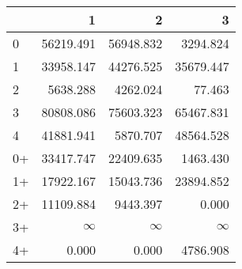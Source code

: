 \begin{tabular}{lrrr}
\toprule
     &         1 &         2 &         3 \\
\midrule
 0   & \num{56219.491} & \num{56948.832} &  \num{3294.824} \\
 1   & \num{33958.147} & \num{44276.525} & \num{35679.447} \\
 2   &  \num{5638.288} &  \num{4262.024} &    \num{77.463} \\
 3   & \num{80808.086} & \num{75603.323} & \num{65467.831} \\
 4   & \num{41881.941} &  \num{5870.707} & \num{48564.528} \\
 0+  & \num{33417.747} & \num{22409.635} &  \num{1463.430} \\
 1+  & \num{17922.167} & \num{15043.736} & \num{23894.852} \\
 2+  & \num{11109.884} &  \num{9443.397} &     \num{0.000} \\
 3+  &  $\infty$    &  $\infty$    &  $\infty$    \\
 4+  &     \num{0.000} &     \num{0.000} &  \num{4786.908} \\
\bottomrule
\end{tabular}